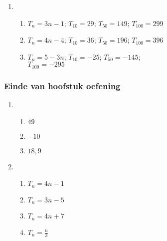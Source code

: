 {\begin{multicols}{3}
\begin{enumerate}[noitemsep, label=\textbf{\arabic*}. ]
\item %
  \begin{enumerate}[noitemsep, label=\textbf{(\alph*)} ]
  \item $T_n=3n-1$; $T_{10}=29$; $T_{50}=149$; $T_{100}=299$%
  \item $T_n=4n-4$; $T_{10}=36$; $T_{50}=196$; $T_{100}=396$%
  \item $T_n=5-3n$; $T_{10}=-25$; $T_{50}=-145$;\\ $T_{100}=-295$%
  \end{enumerate}
\end{enumerate}

\subsubsection*{Einde van hoofstuk oefening} %


\begin{enumerate}[noitemsep, label=\textbf{\arabic*}. ] 
\item %
    \begin{enumerate}[noitemsep, label=\textbf{(\alph*)} ]
  \item $49$%
    \item $-10$%
    \item $18,9$%
    \end{enumerate}


\item %
    \begin{enumerate}[noitemsep, label=\textbf{(\alph*)} ]
    \item $T_n=4n-1$%
    \item $T_n=3n-5$%
    \item $T_n=4n+7$%
    \item $T_n=\frac{n}{3}$%
    \end{enumerate}


\end{enumerate}
\end{multicols}}
